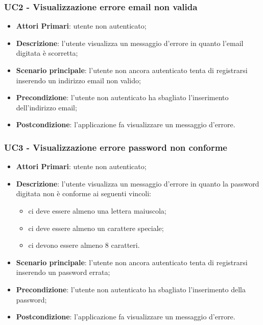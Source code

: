 \subsubsection{UC2 - Visualizzazione errore email non valida}
\begin{itemize}
	\item \textbf{Attori Primari}: utente non autenticato;
	\item \textbf{Descrizione}: l'utente visualizza un messaggio d'errore in quanto l'email digitata è scorretta;
	\item \textbf{Scenario principale}: l'utente non ancora autenticato tenta di registrarsi inserendo un indirizzo email non valido;
	\item \textbf{Precondizione}: l'utente non autenticato ha sbagliato l'inserimento dell'indirizzo email; 
	\item \textbf{Postcondizione}: l'applicazione fa visualizzare un messaggio d'errore.
\end{itemize}
\subsubsection{UC3 - Visualizzazione errore password non conforme}
\begin{itemize}
	\item \textbf{Attori Primari}: utente non autenticato;
	\item \textbf{Descrizione}: l'utente visualizza un messaggio d'errore in quanto la password digitata non è conforme ai seguenti vincoli:
		\begin{itemize}
			\item ci deve essere almeno una lettera maiuscola;
			\item ci deve essere almeno un carattere speciale;
			\item ci devono essere almeno 8 caratteri.
		\end{itemize}
	\item \textbf{Scenario principale}: l'utente non ancora autenticato tenta di registrarsi inserendo un password errata;
	\item \textbf{Precondizione}: l'utente non autenticato ha sbagliato l'inserimento della password; 
	\item \textbf{Postcondizione}: l'applicazione fa visualizzare un messaggio d'errore.
\end{itemize}

